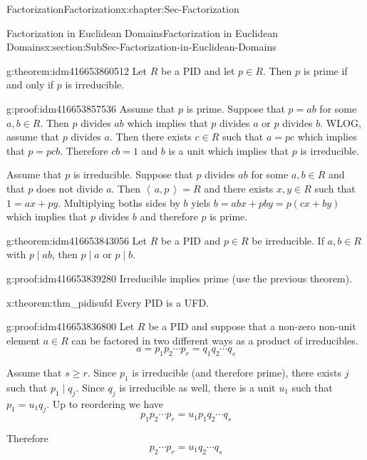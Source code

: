 \documentclass[oneside,10pt,]{book}
\numberwithin{equation}{section}
\renewcommand{\geq}{\geqslant}
\newcommand{\ideal}[1]{\left\langle\, #1 \,\right\rangle}
\begin{document}
\begin{chapterptx}{Factorization}{}{Factorization}{}{}{x:chapter:Sec-Factorization}
\begin{sectionptx}{Factorization in Euclidean Domains}{}{Factorization in Euclidean Domains}{}{}{x:section:SubSec-Factorization-in-Euclidean-Domains}
\begin{theorem}{}{}{g:theorem:idm416653860512}
Let \(R\) be a PID and let \(p\in R\). Then \(p\) is prime if and only if \(p\) is irreducible.%
\end{theorem}
\begin{proofptx}{}{g:proof:idm416653857536}
Assume that \(p\) is prime. Suppose that \(p=ab\) for some \(a,b \in R\). Then \(p\) divides \(ab\) which implies that \(p\) divides \(a\) or \(p\) divides \(b\). WLOG, assume that \(p\) divides \(a\). Then there exists \(c\in R\) such that \(a=pc\) which implies that \(p=pcb\). Therefore \(cb=1\) and \(b\) is a unit which implies that \(p\) is irreducible.%
\par
Assume that \(p\) is irreducible. Suppose that \(p\) divides \(ab\) for some \(a,b \in R\) and that \(p\) does not divide \(a\). Then \(\ideal{a,p}=R\) and there exists \(x,y\in R\) such that \(1=ax+py\). Multiplying boths sides by \(b\) yiels \(b=abx+pby=p(cx+by)\) which implies that \(p\) divides \(b\) and therefore \(p\) is prime.%
\end{proofptx}
\begin{theorem}{}{}{g:theorem:idm416653843056}%
Let \(R\) be a PID and \(p\in R\) be irreducible. If \(a,b\in R\) with \(p\mid ab\), then \(p\mid a\) or \(p\mid b\).%
\end{theorem}
\begin{proofptx}{}{g:proof:idm416653839280}
Irreducible implies prime (use the previous theorem).%
\end{proofptx}
\begin{theorem}{}{}{x:theorem:thm_pidisufd}%
Every PID is a UFD.%
\end{theorem}
\begin{proofptx}{}{g:proof:idm416653836800}
Let \(R\) be a PID and suppose that a non-zero non-unit element \(a\in R\) can be factored in two different ways as a product of irreducibles.%
\begin{equation*}
a=p_1p_2\cdots p_r=q_1q_2\cdots q_s
\end{equation*}
%
\par
Assume that \(s\geq r\). Since \(p_1\) is irreducible (and therefore prime), there exists \(j\) such that \(p_1 \mid q_j\). Since \(q_j\) is irreducible as well, there is a unit \(u_1\) such that \(p_1=u_1 q_j\). Up to reordering we have%
\begin{equation*}
p_1p_2\cdots p_r=u_1p_1q_2\cdots q_s
\end{equation*}
%
\par
Therefore%
\begin{equation*}
p_2\cdots p_r=u_1q_2\cdots q_s

\end{equation*}
\end{proofptx}
\end{sectionptx}
\end{chapterptx}
\end{document}
